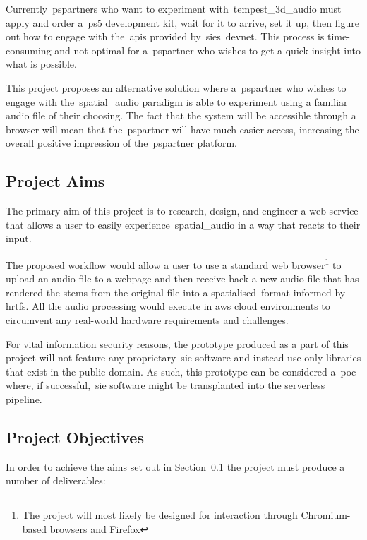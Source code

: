 Currently~\glspl{pspartner} who want to experiment with~\gls{tempest_3d_audio} must apply and order a~\gls{ps5} development kit, wait for it to arrive, set it up, then figure out how to engage with the~\glspl{api} provided by~\gls{sie}\textquotesingle s~\gls{devnet}.
This process is time-consuming and not optimal for a~\gls{pspartner} who wishes to get a quick insight into what is possible.

This project proposes an alternative solution where a~\gls{pspartner} who wishes to engage with the~\gls{spatial_audio} paradigm is able to experiment using a familiar audio file of their choosing.
The fact that the system will be accessible through a browser will mean that the~\gls{pspartner} will have much easier access, increasing the overall positive impression of the~\gls{pspartner} platform.

\subsection{Project Aims}\label{subsec:aims}

The primary aim of this project is to research, design, and engineer a web service that allows a user to easily experience~\gls{spatial_audio} in a way that reacts to their input.

The proposed workflow would allow a user to use a standard web browser\footnote{The project will most likely be designed for interaction through Chromium-based browsers and Firefox} to upload an audio file to a webpage and then receive back a new audio file that has rendered the stems from the original file into a \textquotesingle spatialised\textquotesingle ~format informed by \glspl{hrtf}.
All the audio processing would execute in \gls{aws} cloud environments to circumvent any real-world hardware requirements and challenges.

For vital information security reasons, the prototype produced as a part of this project will not feature any proprietary~\gls{sie} software and instead use only libraries that exist in the public domain.
As such, this prototype can be considered a~\gls{poc} where, if successful,~\gls{sie} software might be transplanted into the serverless pipeline.

\subsection{Project Objectives}\label{subsec:project-objectives}

In order to achieve the aims set out in Section~\ref{subsec:aims} the project must produce a number of deliverables:

